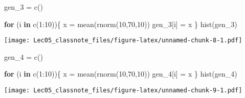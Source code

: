 \documentclass[
]{article}
\newenvironment{Shaded}{\begin{snugshade}}{\end{snugshade}}
\newcommand{\ControlFlowTok}[1]{\textcolor[rgb]{0.13,0.29,0.53}{\textbf{#1}}}
\newcommand{\DecValTok}[1]{\textcolor[rgb]{0.00,0.00,0.81}{#1}}
\newcommand{\FunctionTok}[1]{\textcolor[rgb]{0.00,0.00,0.00}{#1}}
\newcommand{\NormalTok}[1]{#1}
\newcommand{\OtherTok}[1]{\textcolor[rgb]{0.56,0.35,0.01}{#1}}
\newcommand{\SpecialCharTok}[1]{\textcolor[rgb]{0.00,0.00,0.00}{#1}}
\begin{document}
\begin{Shaded}
\begin{Highlighting}[]
\NormalTok{gen\_3 }\OtherTok{=} \FunctionTok{c}\NormalTok{()}

\ControlFlowTok{for}\NormalTok{ (i }\ControlFlowTok{in} \FunctionTok{c}\NormalTok{(}\DecValTok{1}\SpecialCharTok{:}\DecValTok{10}\NormalTok{))\{}
\NormalTok{  x }\OtherTok{=} \FunctionTok{mean}\NormalTok{(}\FunctionTok{rnorm}\NormalTok{(}\DecValTok{10}\NormalTok{,}\DecValTok{70}\NormalTok{,}\DecValTok{10}\NormalTok{))}
\NormalTok{  gen\_3[i] }\OtherTok{=}\NormalTok{ x}
\NormalTok{\}}
\FunctionTok{hist}\NormalTok{(gen\_3)}
\end{Highlighting}
\end{Shaded}

\texttt{[image: Lec05\_classnote\_files/figure-latex/unnamed-chunk-8-1.pdf]}

\begin{Shaded}
\begin{Highlighting}[]
\NormalTok{gen\_4 }\OtherTok{=} \FunctionTok{c}\NormalTok{()}

\ControlFlowTok{for}\NormalTok{ (i }\ControlFlowTok{in} \FunctionTok{c}\NormalTok{(}\DecValTok{1}\SpecialCharTok{:}\DecValTok{10}\NormalTok{))\{}
\NormalTok{  x }\OtherTok{=} \FunctionTok{mean}\NormalTok{(}\FunctionTok{rnorm}\NormalTok{(}\DecValTok{10}\NormalTok{,}\DecValTok{70}\NormalTok{,}\DecValTok{10}\NormalTok{))}
\NormalTok{  gen\_4[i] }\OtherTok{=}\NormalTok{ x}
\NormalTok{\}}
\FunctionTok{hist}\NormalTok{(gen\_4)}
\end{Highlighting}
\end{Shaded}

\texttt{[image: Lec05\_classnote\_files/figure-latex/unnamed-chunk-9-1.pdf]}
\end{document}
